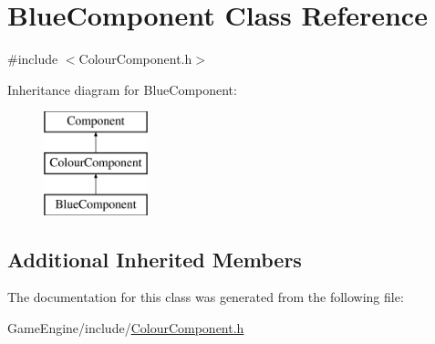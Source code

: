\hypertarget{class_blue_component}{}\section{Blue\+Component Class Reference}
\label{class_blue_component}


{\ttfamily \#include $<$Colour\+Component.\+h$>$}

Inheritance diagram for Blue\+Component\+:\begin{figure}[H]
\begin{center}
\leavevmode
\includegraphics[height=3.000000cm]{class_blue_component}
\end{center}
\end{figure}
\subsection*{Additional Inherited Members}


The documentation for this class was generated from the following file\+:\begin{DoxyCompactItemize}
\item 
Game\+Engine/include/\mbox{\hyperlink{_colour_component_8h}{Colour\+Component.\+h}}\end{DoxyCompactItemize}
